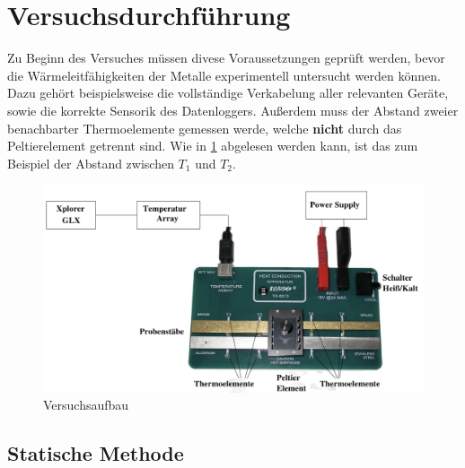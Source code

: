 %

%
\section{Versuchsdurchführung}
\label{sec:Versuchsdurchführung}

Zu Beginn des Versuches müssen divese Voraussetzungen geprüft werden, bevor die Wärmeleitfähigkeiten der Metalle experimentell untersucht werden können.
Dazu gehört beispielsweise die vollständige Verkabelung aller relevanten Geräte, sowie die korrekte Sensorik des Datenloggers. Außerdem muss der Abstand 
zweier benachbarter Thermoelemente gemessen werde, welche \textbf{nicht} durch das Peltierelement getrennt sind. Wie in \ref{fig:Versuchsaufbau} abgelesen werden kann,
ist das zum Beispiel der Abstand zwischen $T_1$ und $T_2$. 

\begin{figure}
    \centering
    \includegraphics[width=\textwidth]{./content/Versuchsaufbau_v204.png}
    \caption{Versuchsaufbau}
    \label{fig:Versuchsaufbau}
\end{figure}

\subsection{Statische Methode}
\label{sec:Statische Methode}

